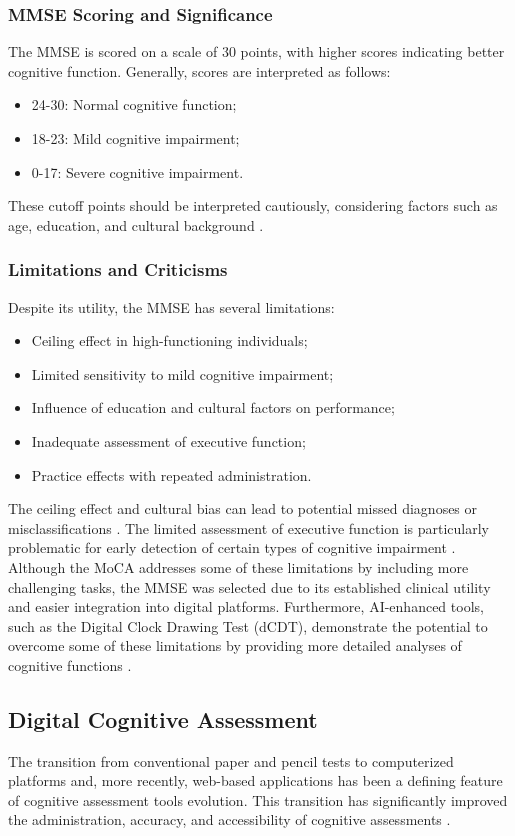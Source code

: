 \subsubsection{MMSE Scoring and Significance}
The MMSE is scored on a scale of 30 points, with higher scores indicating better cognitive function. Generally, scores are interpreted as follows:
\begin{itemize}
    \item 24-30: Normal cognitive function;
    \item 18-23: Mild cognitive impairment;
    \item 0-17: Severe cognitive impairment.
\end{itemize}
These cutoff points should be interpreted cautiously, considering factors such as age, education, and cultural background \cite{Kukull1994}.

\subsubsection{Limitations and Criticisms}
Despite its utility, the MMSE has several limitations:
\begin{itemize}
    \item Ceiling effect in high-functioning individuals;
    \item Limited sensitivity to mild cognitive impairment;
    \item Influence of education and cultural factors on performance;
    \item Inadequate assessment of executive function;
    \item Practice effects with repeated administration.
\end{itemize}
The ceiling effect and cultural bias can lead to potential missed diagnoses or misclassifications \cite{FrancoMarina2010, Kim2010}. The limited assessment of executive function is particularly problematic for early detection of certain types of cognitive impairment \cite{Diamond2013}. Although the MoCA addresses some of these limitations by including more challenging tasks, the MMSE was selected due to its established clinical utility and easier integration into digital platforms. Furthermore, AI-enhanced tools, such as the Digital Clock Drawing Test (dCDT), demonstrate the potential to overcome some of these limitations by providing more detailed analyses of cognitive functions \cite{Jiménez-Mesa2023}.

\subsection{Digital Cognitive Assessment}
The transition from conventional paper and pencil tests to computerized platforms and, more recently, web-based applications has been a defining feature of cognitive assessment tools evolution. This transition has significantly improved the administration, accuracy, and accessibility of cognitive assessments \cite{Bauer2012, Zygouris2017}.


